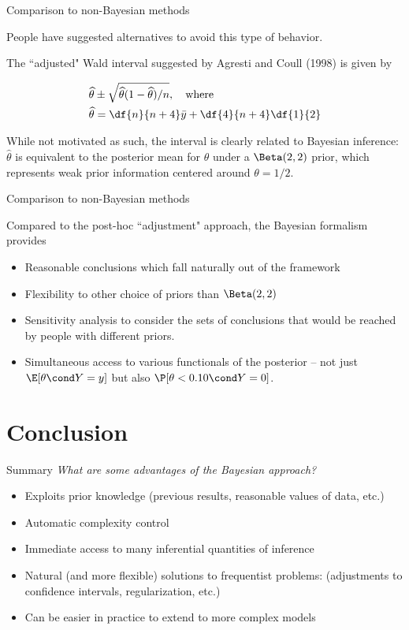 \documentclass[10pt]{beamer}
\begin{document}
\begin{frame}{Comparison to non-Bayesian methods}

People have suggested alternatives to avoid this type of behavior.  \pause 

The ``adjusted" Wald interval suggested by Agresti and Coull (1998) is given by

\begin{align*}
\widehat{\theta} & \pm \sqrt{\widehat{\theta} (1 - \widehat{\theta}) / n},  \quad \text{where} \\
\widehat{\theta}  &= \df{n}{n+4} \bar{y} + \df{4}{n+4} \df{1}{2}
\end{align*}

\pause 
While not motivated as such,  the interval is clearly related to Bayesian inference:  $\widehat{\theta}$ is equivalent to the posterior mean for $\theta$ under a $\Beta(2,2)$ prior,  which represents weak prior information centered around $\theta = 1/2$.

\end{frame}

\begin{frame}{Comparison to non-Bayesian methods}

Compared to the post-hoc ``adjustment" approach,  the Bayesian formalism provides

\begin{itemize}
\item Reasonable conclusions which fall naturally out of the framework
\item Flexibility to other choice of priors than $\Beta(2,2)$
\item Sensitivity analysis to consider the sets of conclusions that would be reached by people with different priors. 
\item Simultaneous access to various functionals of the posterior -- not just $\E[\theta \cond Y= y]$ but also $\P [\theta < 0.10 \cond Y=0]$.
\end{itemize}

\end{frame}

\section{Conclusion}

\begin{frame}{Summary}
\textit{What are some advantages of the Bayesian approach?} \pause 
\begin{itemize}
\item Exploits prior knowledge {\tiny (previous results, reasonable values of data, etc.)} \pause 
\item Automatic complexity control \pause 
\item Immediate access to many inferential quantities of inference \pause 
\item Natural (and more flexible) solutions to frequentist problems:  {\tiny (adjustments to confidence intervals, regularization, etc.) }  \pause 
\item Can be easier in practice to extend to more complex models 
\end{itemize}
	
\end{frame}
\end{document}

